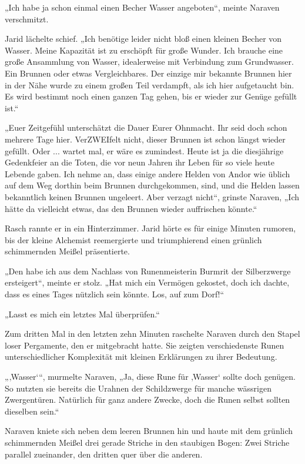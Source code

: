 „Ich habe ja schon einmal einen Becher Wasser angeboten“, meinte Naraven verschmitzt.

Jarid lächelte schief. „Ich benötige leider nicht bloß einen kleinen Becher von Wasser. Meine Kapazität ist zu erschöpft für große Wunder. Ich brauche eine große Ansammlung von Wasser, idealerweise mit Verbindung zum Grundwasser. Ein Brunnen oder etwas Vergleichbares. Der einzige mir bekannte Brunnen hier in der Nähe wurde zu einem großen Teil verdampft, als ich hier aufgetaucht bin. Es wird bestimmt noch einen ganzen Tag gehen, bis er wieder zur Genüge gefüllt ist.“

„Euer Zeitgefühl unterschätzt die Dauer Eurer Ohnmacht. Ihr seid doch schon mehrere Tage hier. VerZWEIfelt nicht, dieser Brunnen ist schon längst wieder gefüllt. Oder ... wartet mal, er wäre es zumindest. Heute ist ja die diesjährige Gedenkfeier an die Toten, die vor neun Jahren ihr Leben für so viele heute Lebende gaben. Ich nehme an, dass einige andere Helden von Andor wie üblich auf dem Weg dorthin beim Brunnen durchgekommen, sind, und die Helden lassen bekanntlich keinen Brunnen ungeleert. Aber verzagt nicht“, grinste Naraven, „Ich hätte da vielleicht etwas, das den Brunnen wieder auffrischen könnte.“

Rasch rannte er in ein Hinterzimmer. Jarid hörte es für einige Minuten rumoren, bis der kleine Alchemist reemergierte und triumphierend einen grünlich schimmernden Meißel präsentierte.

„Den habe ich aus dem Nachlass von Runenmeisterin Burmrit der Silberzwerge ersteigert“, meinte er stolz. „Hat mich ein Vermögen gekostet, doch ich dachte, dass es eines Tages nützlich sein könnte. Los, auf zum Dorf!“



\trennzeichen



„Lasst es mich ein letztes Mal überprüfen.“

Zum dritten Mal in den letzten zehn Minuten raschelte Naraven durch den Stapel loser Pergamente, den er mitgebracht hatte. Sie zeigten verschiedenste Runen unterschiedlicher Komplexität mit kleinen Erklärungen zu ihrer Bedeutung.

„‚Wasser‘“, murmelte Naraven, „Ja, diese Rune für ‚Wasser‘ sollte doch genügen. So nutzten sie bereits die Urahnen der Schildzwerge für manche wässrigen Zwergentüren. Natürlich für ganz andere Zwecke, doch die Runen selbst sollten dieselben sein.“

Naraven kniete sich neben dem leeren Brunnen hin und haute mit dem grünlich schimmernden Meißel drei gerade Striche in den staubigen Bogen: Zwei Striche parallel zueinander, den dritten quer über die anderen.

